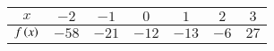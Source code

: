 \begin{tabular}{|c|c|c|c|c|c|c|}
\hline
    $x$ & $-2$ &$-1$ & $0$ & $1$ & $2$ & $3$  \\
\hline
    $f\left(x\right)$ & $-58$ & $-21$ & $-12$ & $-13$ & $-6$ & $27$\\
\hline
\end{tabular}
